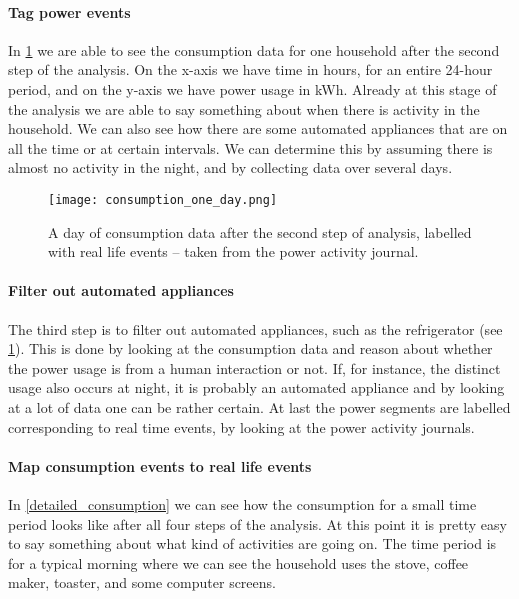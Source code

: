 \paragraph{Tag power events}
In \cref{consumption_one_day} we are able to see the consumption data for one household after the second step of the analysis.
On the x-axis we have time in hours, for an entire 24-hour period, and on the y-axis we have power usage in kWh.
Already at this stage of the analysis we are able to say something about when there is activity in the household.
We can also see how there are some automated appliances that are on all the time or at certain intervals.
We can determine this by assuming there is almost no activity in the night, and by collecting data over several days.

\begin{figure}
  \begin{center}
    \texttt{[image: consumption\_one\_day.png]}
  \end{center}
  \caption{A day of consumption data after the second step of analysis, labelled with real life events -- taken from the power activity journal.}
  \label{consumption_one_day}
\end{figure}

\paragraph{Filter out automated appliances}
The third step is to filter out automated appliances, such as the refrigerator (see \cref{consumption_one_day}).
This is done by looking at the consumption data and reason about whether the power usage is from a human interaction or not.
If, for instance, the distinct usage also occurs at night, it is probably an automated appliance and by looking at a lot of data one can be rather certain.
At last the power segments are labelled corresponding to real time events, by looking at the power activity journals.

\paragraph{Map consumption events to real life events}
In \cref{detailed_consumption} we can see how the consumption for a small time period looks like after all four steps of the analysis.
At this point it is pretty easy to say something about what kind of activities are going on.
The time period is for a typical morning where we can see the household uses the stove, coffee maker, toaster, and some computer screens.

